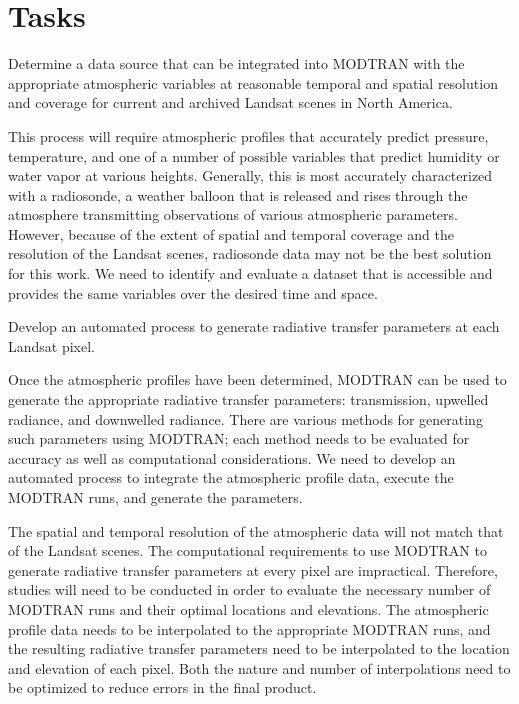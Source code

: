 \documentclass{book}
\begin{document}
\section{Tasks}
\label{sec:tasks}

\begin{enumerate}

{\bf \item Determine a data source that can be integrated into MODTRAN with the appropriate atmospheric variables at reasonable temporal and spatial resolution and coverage for current and archived Landsat scenes in North America.}

This process will require atmospheric profiles that accurately predict pressure, temperature, and one of a number of possible variables that predict humidity or water vapor at various heights.  Generally, this is most accurately characterized with a radiosonde, a weather balloon that is released and rises through the atmosphere transmitting observations of various atmospheric parameters.  However, because of the extent of spatial and temporal coverage and the resolution of the Landsat scenes, radiosonde data may not be the best solution for this work.  We need to identify and evaluate a dataset that is accessible and provides the same variables over the desired time and space.

{\bf \item Develop an automated process to generate radiative transfer parameters at each Landsat pixel.}

Once the atmospheric profiles have been determined, MODTRAN can be used to generate the appropriate radiative transfer parameters: transmission, upwelled radiance, and downwelled radiance.  There are various methods for generating such parameters using MODTRAN; each method needs to be evaluated for accuracy as well as computational considerations.  We need to develop an automated process to integrate the atmospheric profile data, execute the MODTRAN runs, and generate the parameters.

The spatial and temporal resolution of the atmospheric data will not match that of the Landsat scenes.  The computational requirements to use MODTRAN to generate radiative transfer parameters at every pixel are impractical.  Therefore, studies will need to be conducted in order to evaluate the necessary number of MODTRAN runs and their optimal locations and elevations.  The atmospheric profile data needs to be interpolated to the appropriate MODTRAN runs, and the resulting radiative transfer parameters need to be interpolated to the location and elevation of each pixel.  Both the nature and number of interpolations need to be optimized to reduce errors in the final product.


\end{enumerate}
\end{document}
